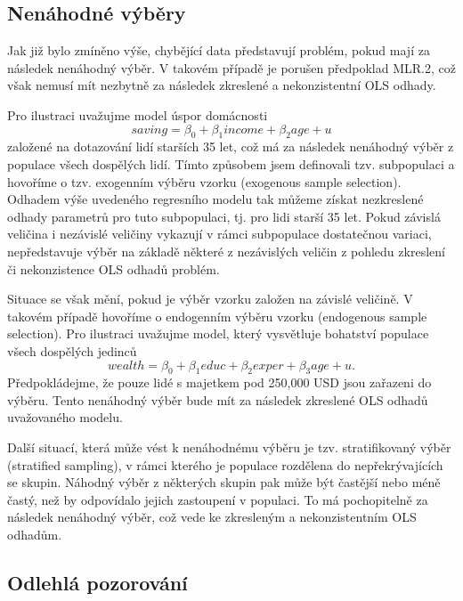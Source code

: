 \subsection{Nenáhodné výběry}

Jak již bylo zmíněno výše, chybějící data představují problém, pokud mají za následek nenáhodný výběr. V takovém případě je porušen předpoklad MLR.2, což však nemusí mít nezbytně za následek zkreslené a nekonzistentní OLS odhady.

Pro ilustraci uvažujme model úspor domácnosti
\begin{equation}
saving = \beta_0 + \beta_1 income + \beta_2 age + u
\end{equation}
založené na dotazování lidí starších 35 let, což má za následek nenáhodný výběr z populace všech dospělých lidí. Tímto způsobem jsem definovali tzv. subpopulaci a hovoříme o tzv. exogenním výběru vzorku (exogenous sample selection). Odhadem výše uvedeného regresního modelu tak můžeme získat nezkreslené odhady parametrů pro tuto subpopulaci, tj. pro lidi starší 35 let. Pokud závislá veličina i nezávislé veličiny vykazují v rámci subpopulace dostatečnou variaci, nepředstavuje výběr na základě některé z nezávislých veličin z pohledu zkreslení či nekonzistence OLS odhadů problém.

Situace se však mění, pokud je výběr vzorku založen na závislé veličině. V takovém případě hovoříme o endogenním výběru vzorku (endogenous sample selection). Pro ilustraci uvažujme model, který vysvětluje bohatství populace všech dospělých jedinců
\begin{equation}
wealth = \beta_0 + \beta_1 educ + \beta_2 exper + \beta_3 age + u.
\end{equation}
Předpokládejme, že pouze lidé s majetkem pod 250,000 USD jsou zařazeni do výběru. Tento nenáhodný výběr bude mít za následek zkreslené OLS odhadů uvažovaného modelu.

Další situací, která může vést k nenáhodnému výběru je tzv. stratifikovaný výběr (stratified sampling), v rámci kterého je populace rozdělena do nepřekrývajících se skupin. Náhodný výběr z některých skupin pak může být častější nebo méně častý, než by odpovídalo jejich zastoupení v populaci. To má pochopitelně za následek nenáhodný výběr, což vede ke zkresleným a nekonzistentním OLS odhadům.

\subsection{Odlehlá pozorování}

